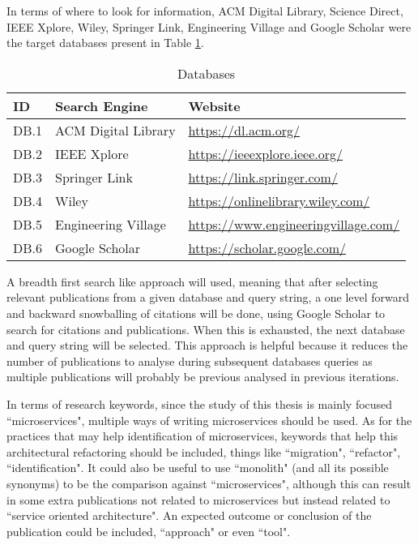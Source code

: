 \documentclass{article}
\begin{document}
In terms of where to look for information, ACM Digital Library, Science Direct,
IEEE Xplore, Wiley, Springer Link, Engineering Village and Google Scholar were
the target databases present in Table \ref{tab:databases}.

\begin{table}[H] \caption{Databases} \label{tab:databases}
  \begin{center}
    \begin{tabular}[c]{l|l|l} \textbf{ID} & \textbf{Search Engine} &
      \textbf{Website} \\
      \hline DB.1 & ACM Digital Library & \url{https://dl.acm.org/} \\
      \hline DB.2 & IEEE Xplore & \url{https://ieeexplore.ieee.org/} \\
      \hline DB.3 & Springer Link & \url{https://link.springer.com/} \\
      \hline DB.4 & Wiley & \url{https://onlinelibrary.wiley.com/} \\
      \hline DB.5 & Engineering Village &
      \url{https://www.engineeringvillage.com/} \\
      \hline DB.6 & Google Scholar & \url{https://scholar.google.com/} \\
    \end{tabular}
  \end{center}
\end{table}



A breadth first search like approach will used, meaning that after selecting
relevant publications from a given database and query string, a one level
forward and backward snowballing of citations will be done, using Google
Scholar to search for citations and publications. When this is exhausted, the
next database and query string will be selected. This approach is helpful
because it reduces the number of publications to analyse during subsequent
databases queries as multiple publications will probably be previous analysed
in previous iterations.

In terms of research keywords, since the study of this thesis is mainly
focused ``microservices", multiple ways of writing microservices should be
used. As for the practices that may help identification of microservices,
keywords that help this architectural refactoring should be included, things
like ``migration", ``refactor", ``identification". It could also be useful to
use ``monolith" (and all its possible synonyms) to be the comparison against
``microservices", although this can result in some extra publications not
related to microservices but instead related to ``service oriented
architecture". An expected outcome or conclusion of the publication could be
included, ``approach" or even ``tool".
\end{document}
